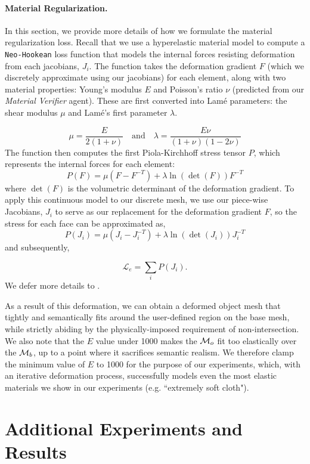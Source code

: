 \paragraph{Material Regularization.}
In this section, we provide more details of how we formulate the material regularization loss.
Recall that we use a hyperelastic material model to compute a \texttt{Neo-Hookean} loss function that models the internal forces resisting deformation from each jacobians, $J_i$. 
The function takes the deformation gradient $F$ (which we discretely approximate using our jacobians) for each element, along with two material properties: Young's modulus $E$ and Poisson's ratio $\nu$ (predicted from our \textit{Material Verifier} agent). These are first converted into Lamé parameters: the shear modulus $\mu$ and Lamé's first parameter $\lambda$.

$$
\mu = \frac{E}{2(1 + \nu)} \quad \text{and} \quad \lambda = \frac{E\nu}{(1 + \nu)(1 - 2\nu)}
$$
The function then computes the first Piola-Kirchhoff stress tensor $P$, which represents the internal forces for each element:
$$
P(F) = \mu (F - F^{-T}) + \lambda \ln(\det(F)) F^{-T}
$$
where $\det(F)$ is the volumetric determinant of the deformation gradient. To apply this continuous model to our discrete mesh, we use our piece-wise Jacobians, $J_i$ to serve as our replacement for the deformation gradient $F$, so the stress for each face can be approximated as, 
$$
P(J_i) = \mu (J_i - J_i^{-T}) + \lambda \ln(\det(J_i)) J_i^{-T}
$$
and subsequently, 

$$
\mathcal{L}_{e} =  \sum_i  P(J_i).
$$
We defer more details to \cite{sifakis2012fem}.

As a result of this deformation, we can obtain a deformed object mesh that tightly and semantically fits around the user-defined region on the base mesh, while strictly abiding by the physically-imposed requirement of non-intersection. We also note that the $E$ value under 1000 makes the $\mathcal{M}_o$ fit too elastically over the $\mathcal{M}_b$, up to a point where it sacrifices semantic realism. We therefore clamp the minimum value of $E$ to 1000 for the purpose of our experiments, which, with an iterative deformation process, successfully models even the most elastic materials we show in our experiments (e.g. ``extremely soft cloth").


\section{Additional Experiments and Results}
\label{sec:additional_results}
